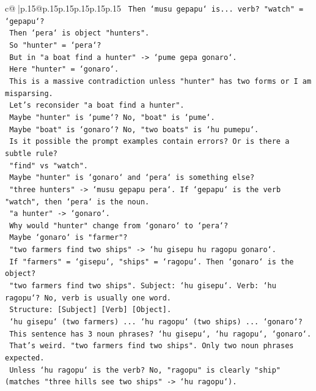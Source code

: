 \documentclass{article}
\begin{document}
{\begin{supertabular}{c@{$\;$}|p{.15\linewidth}@{}p{.15\linewidth}p{.15\linewidth}p{.15\linewidth}p{.15\linewidth}p{.15\linewidth}}
{{{\texttt{     Then `musu gepapu` is... verb? "watch" = `gepapu`?} \\
\texttt{     Then `pera` is object "hunters".} \\
\texttt{     So "hunter" = `pera`?} \\
\texttt{     But in "a boat find a hunter" {-}> `pume gepa gonaro`.} \\
\texttt{     Here "hunter" = `gonaro`.} \\
\texttt{     This is a massive contradiction unless "hunter" has two forms or I am misparsing.} \\
\texttt{     Let's reconsider "a boat find a hunter".} \\
\texttt{     Maybe "hunter" is `pume`? No, "boat" is `pume`.} \\
\texttt{     Maybe "boat" is `gonaro`? No, "two boats" is `hu pumepu`.} \\
\texttt{     Is it possible the prompt examples contain errors? Or is there a subtle rule?} \\
\texttt{     "find" vs "watch".} \\
\texttt{     Maybe "hunter" is `gonaro` and `pera` is something else?} \\
\texttt{     "three hunters" {-}> `musu gepapu pera`. If `gepapu` is the verb "watch", then `pera` is the noun.} \\
\texttt{     "a hunter" {-}> `gonaro`.} \\
\texttt{     Why would "hunter" change from `gonaro` to `pera`?} \\
\texttt{     Maybe `gonaro` is "farmer"?} \\
\texttt{     "two farmers find two ships" {-}> `hu gisepu hu ragopu gonaro`.} \\
\texttt{     If "farmers" = `gisepu`, "ships" = `ragopu`. Then `gonaro` is the object?} \\
\texttt{     "two farmers find two ships". Subject: `hu gisepu`. Verb: `hu ragopu`? No, verb is usually one word.} \\
\texttt{     Structure: {[}Subject{]} {[}Verb{]} {[}Object{]}.} \\
\texttt{     `hu gisepu` (two farmers) ... `hu ragopu` (two ships) ... `gonaro`?} \\
\texttt{     This sentence has 3 noun phrases? `hu gisepu`, `hu ragopu`, `gonaro`.} \\
\texttt{     That's weird. "two farmers find two ships". Only two noun phrases expected.} \\
\texttt{     Unless `hu ragopu` is the verb? No, "ragopu" is clearly "ship" (matches "three hills see two ships" {-}> `hu ragopu`).} \\
}}}
\end{supertabular}}
\end{document}
